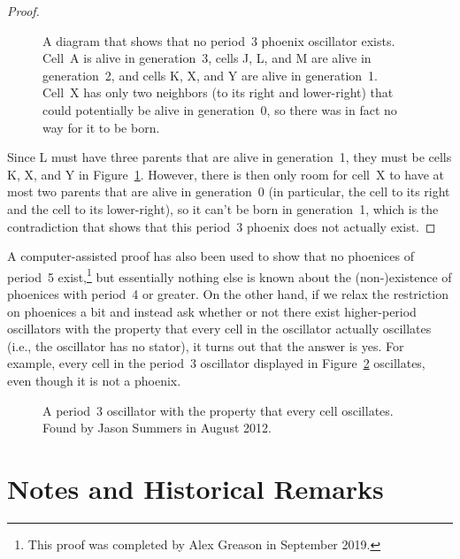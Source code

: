 \begin{proof}
\begin{figure}[!ht]
{}
		\caption{A diagram that shows that no period~3 phoenix oscillator exists. Cell~A is alive in generation~3, cells J, L, and M are alive in generation~2, and cells K, X, and Y are alive in generation~1. Cell~X has only two neighbors (to its right and lower-right) that could potentially be alive in generation~0, so there was in fact no way for it to be born.}\label{fig:phoenix_proof_3}
	\end{figure}
	
	Since L must have three parents that are alive in generation~1, they must be cells K, X, and Y in Figure~\ref{fig:phoenix_proof_3}. However, there is then only room for cell~X to have at most two parents that are alive in generation~0 (in particular, the cell to its right and the cell to its lower-right), so it can't be born in generation~1, which is the contradiction that shows that this period~3 phoenix does not actually exist.
\end{proof}

A computer-assisted proof has also been used to show that no phoenices of period~5 exist,\footnote{This proof was completed by Alex Greason in September 2019.} but essentially nothing else is known about the (non-)existence of phoenices with period~4 or greater. On the other hand, if we relax the restriction on phoenices a bit and instead ask whether or not there exist higher-period oscillators with the property that every cell in the oscillator actually oscillates (i.e., the oscillator has no stator), it turns out that the answer is yes. For example, every cell in the period~3 oscillator displayed in Figure~\ref{fig:period_3_volatile} oscillates, even though it is not a phoenix.

\begin{figure}[!htb]
	\centering
	\caption{A period~3 oscillator with the property that every cell oscillates. Found by Jason Summers in August 2012.}\label{fig:period_3_volatile}
\end{figure}


\section{Notes and Historical Remarks}\label{sec:oscillators_notes}


